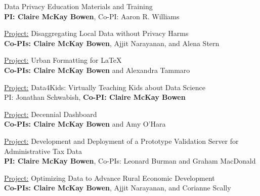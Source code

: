 \documentclass[11pt, letterpaper, roman]{moderncv} %
\begin{document}
\vspace{2pt}    
    {
        Data Privacy Education Materials and Training\\
        \textbf{PI: Claire McKay Bowen}, Co-PI: Aaron R. Williams
    }
    
\vspace{2pt}   
    {
        \underline{Project:} Disaggregating Local Data without Privacy Harms\\
        \textbf{Co-PIs: Claire McKay Bowen}, Ajjit Narayanan, and Alena Stern
    }

\vspace{2pt}    
    {
        \underline{Project:} Urban Formatting for LaTeX\\
        \textbf{Co-PIs: Claire McKay Bowen} and Alexandra Tammaro
    }

\vspace{2pt}    
    {
        \underline{Project:} Data4Kids: Virtually Teaching Kids about Data Science\\
        PI: Jonathan Schwabish, \textbf{Co-PI: Claire McKay Bowen}
    }

\vspace{2pt}
    {
        \underline{Project:} Decennial Dashboard\\
        \textbf{Co-PIs: Claire McKay Bowen} and Amy O'Hara
    }

\vspace{2pt}
    {
        \underline{Project:} Development and Deployment of a Prototype Validation Server for Administrative Tax Data\\
        \textbf{PI: Claire McKay Bowen}, Co-PIs: Leonard Burman and Graham MacDonald
    }

\vspace{2pt}
    {
        \underline{Project:} Optimizing Data to Advance Rural Economic Development\\
        \textbf{Co-PIs: Claire McKay Bowen}, Ajjit Narayanan, and Corianne Scally 
    }
\end{document}
